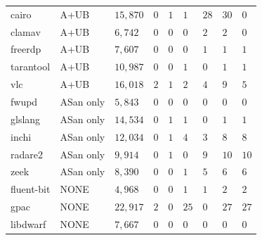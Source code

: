 \begin{adjustbox}{width=\textwidth,center}
\begin{tabular}{|l|l|l|l|l|l|l|l|l|}
\hline
cairo            & A+UB                & $15,870$            & $0$              & $1$           & $1$           & $28$           & $30$            & $0$                 \\
clamav           & A+UB                & $6,742$             & $0$              & $0$           & $0$           & $2$            & $2$             & $0$                 \\
freerdp          & A+UB                & $7,607$             & $0$              & $0$           & $0$           & $1$            & $1$             & $1$                 \\
tarantool        & A+UB                & $10,987$            & $0$              & $0$           & $1$           & $0$            & $1$             & $1$                 \\
vlc              & A+UB                & $16,018$            & $2$              & $1$           & $2$           & $4$            & $9$             & $5$                 \\ 
\hline
fwupd            & ASan only                & $5,843$             & $0$              & $0$           & $0$           & $0$            & $0$             & $0$                 \\
glslang          & ASan only                & $14,534$            & $0$              & $1$           & $1$           & $0$            & $1$             & $1$                 \\
inchi            & ASan only                & $12,034$            & $0$              & $1$           & $4$           & $3$            & $8$             & $8$                 \\
radare2          & ASan only                & $9,914$             & $0$              & $1$           & $0$           & $9$            & $10$            & $10$                \\
zeek             & ASan only                & $8,390$             & $0$              & $0$           & $1$           & $5$            & $6$             & $6$                 \\ 
\hline
fluent-bit       & NONE                & $4,968$             & $0$              & $0$           & $1$           & $1$            & $2$             & $2$                 \\
gpac             & NONE                & $22,917$            & $2$         & $0$           & $25$          & $0$            & $27$            & $27$                \\
libdwarf         & NONE                & $7,667$             & $0$              & $0$           & $0$           & $0$            & $0$             & $0$                 \\

\end{tabular}
\end{adjustbox}
